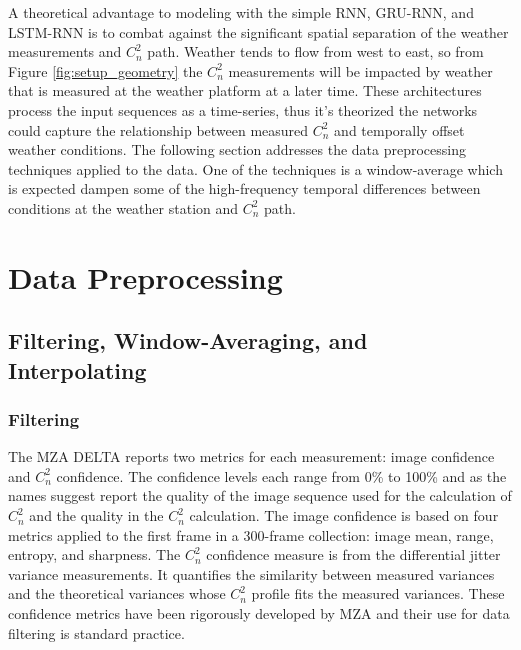 A theoretical advantage to modeling with the simple \ac{RNN}, \ac{GRU-RNN}, and \ac{LSTM-RNN} is to combat against the significant spatial separation of the weather measurements and $C_{n}^{2}$ path. Weather tends to flow from west to east, so from Figure \ref{fig:setup_geometry} the $C_{n}^{2}$ measurements will be impacted by weather that is measured at the weather platform at a later time. These architectures process the input sequences as a time-series, thus it's theorized the networks could capture the relationship between measured $C_{n}^{2}$ and temporally offset weather conditions. The following section addresses the data preprocessing techniques applied to the data. One of the techniques is a window-average which is expected dampen some of the high-frequency temporal differences between conditions at the weather station and $C_{n}^{2}$ path.

\section{Data Preprocessing}
\subsection{Filtering, Window-Averaging, and Interpolating}
\label{sec:filt_winavg_interp}
\subsubsection{Filtering}
The MZA \ac{DELTA} reports two metrics for each measurement: image confidence and $C_{n}^{2}$ confidence. The confidence levels each range from 0\% to 100\% and as the names suggest report the quality of the image sequence used for the calculation of $C_{n}^{2}$ and the quality in the $C_{n}^{2}$ calculation. The image confidence is based on four metrics applied to the first frame in a 300-frame collection: image mean, range, entropy, and sharpness. The $C_{n}^{2}$ confidence measure is from the differential jitter variance measurements. It quantifies the similarity between measured variances and the theoretical variances whose $C_{n}^{2}$ profile fits the measured variances. These confidence metrics have been rigorously developed by MZA and their use for data filtering is standard practice.

